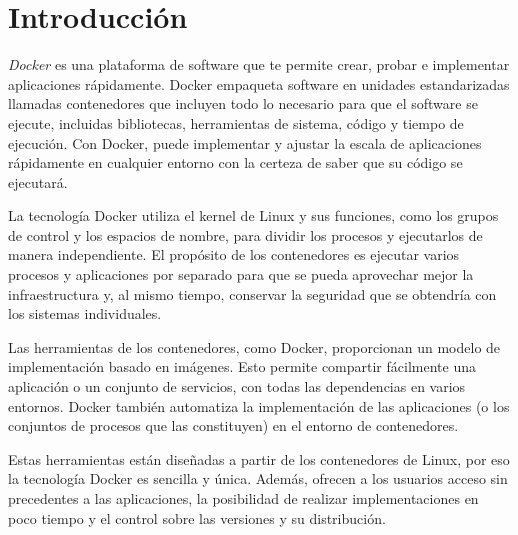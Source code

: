 \documentclass{dense_template}
\begin{document}
\maketitle
\tableofcontents
\newpage
\section{Introducción}
\textit{Docker} es una plataforma de software que te permite crear, probar e implementar aplicaciones rápidamente. Docker empaqueta software en unidades estandarizadas llamadas contenedores que incluyen todo lo necesario para que el software se ejecute, incluidas bibliotecas, herramientas de sistema, código y tiempo de ejecución. Con Docker, puede implementar y ajustar la escala de aplicaciones rápidamente en cualquier entorno con la certeza de saber que su código se ejecutará.

La tecnología Docker utiliza el kernel de Linux y sus funciones, como los grupos de control y los espacios de nombre, para dividir los procesos y ejecutarlos de manera independiente. El propósito de los contenedores es ejecutar varios procesos y aplicaciones por separado para que se pueda aprovechar mejor la infraestructura y, al mismo tiempo, conservar la seguridad que se obtendría con los sistemas individuales.

Las herramientas de los contenedores, como Docker, proporcionan un modelo de implementación basado en imágenes. Esto permite compartir fácilmente una aplicación o un conjunto de servicios, con todas las dependencias en varios entornos. Docker también automatiza la implementación de las aplicaciones (o los conjuntos de procesos que las constituyen) en el entorno de contenedores.

Estas herramientas están diseñadas a partir de los contenedores de Linux, por eso la tecnología Docker es sencilla y única. Además, ofrecen a los usuarios acceso sin precedentes a las aplicaciones, la posibilidad de realizar implementaciones en poco tiempo y el control sobre las versiones y su distribución.
\end{document}
